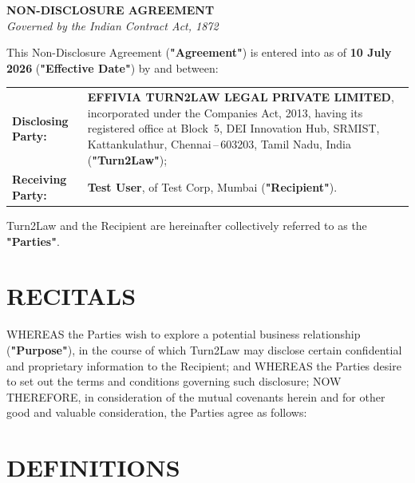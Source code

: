 \documentclass[10pt]{article}
\begin{document}
\thispagestyle{empty}

\begin{center}
  {\fontsize{15pt}{19pt}\selectfont\textbf{NON-DISCLOSURE AGREEMENT}}\\[4pt]
  {\fontsize{9pt}{12pt}\selectfont\textit{Governed by the Indian Contract Act, 1872}}
\end{center}

\vspace{10pt}
\noindent This Non-Disclosure Agreement (\textbf{"Agreement"}) is entered into as of \textbf{10 July 2026} (\textbf{"Effective Date"}) by and between:

\vspace{8pt}
\begin{tabularx}{\textwidth}{@{}lX@{}}
\textbf{Disclosing Party:} &
\textbf{EFFIVIA TURN2LAW LEGAL PRIVATE LIMITED}, incorporated under the Companies Act, 2013, having its registered office at Block~5, DEI Innovation Hub, SRMIST, Kattankulathur, Chennai\,--\,603203, Tamil Nadu, India (\textbf{"Turn2Law"});\\[6pt]
\textbf{Receiving Party:} &
\textbf{Test User}, of Test Corp, Mumbai (\textbf{"Recipient"}).\\
\end{tabularx}

\vspace{6pt}
\noindent Turn2Law and the Recipient are hereinafter collectively referred to as the \textbf{"Parties"}.

\section*{RECITALS}

WHEREAS the Parties wish to explore a potential business relationship (\textbf{"Purpose"}), in the course of which Turn2Law may disclose certain confidential and proprietary information to the Recipient; and WHEREAS the Parties desire to set out the terms and conditions governing such disclosure; NOW THEREFORE, in consideration of the mutual covenants herein and for other good and valuable consideration, the Parties agree as follows:

\section{DEFINITIONS}
\end{document}
